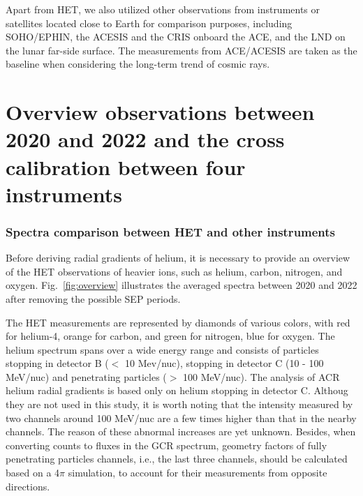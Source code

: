 Apart from \ac{HET}, we also utilized other observations from instruments or satellites located close to Earth for comparison purposes, including \ac{SOHO}/\ac{EPHIN}, the \ac{ACESIS} and the \acs{CRIS} onboard the \acs{ACE}, and the \acs{LND} on the lunar far-side surface. The measurements from \ac{ACE}/\ac{ACESIS} are taken as the baseline when considering the long-term trend of cosmic rays. 

\section{Overview observations between 2020 and 2022 and the cross calibration between four instruments}

\subsubsection*{Spectra comparison between \ac{HET} and other instruments}
Before deriving radial gradients of helium, it is necessary to provide an overview of the \ac{HET} observations of heavier ions, such as helium, carbon, nitrogen, and oxygen. Fig.~\ref{fig:overview} illustrates the averaged spectra between 2020 and 2022 after removing the possible \ac{SEP} periods.


The \ac{HET} measurements are represented by diamonds of various colors, with red for helium-4, orange for carbon, and green for nitrogen, blue for oxygen.
The helium spectrum spans over a wide energy range and consists of particles stopping in detector B ($<$ 10 Mev/nuc), stopping in detector C (10 - 100 MeV/nuc) and penetrating particles ($>$ 100 MeV/nuc). 
The analysis of \ac{ACR} helium radial gradients is based only on helium stopping in detector C.
Althoug they are not used in this study, it is worth noting that the intensity measured by two channels around 100 MeV/nuc are a few times higher than that in the nearby channels. The reason of these abnormal increases are yet unknown.
Besides, when converting counts to fluxes in the \ac{GCR} spectrum, geometry factors of fully penetrating particles channels, i.e., the last three channels, should be calculated based on a 4$\pi$ simulation, to account for their measurements from opposite directions.


